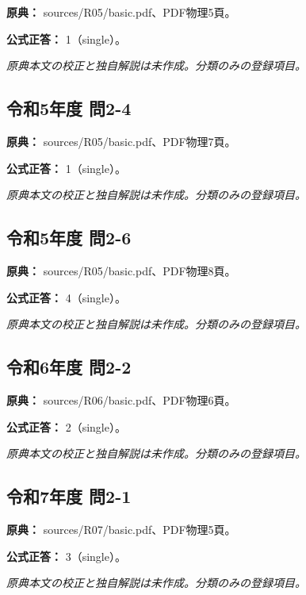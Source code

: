 \noindent\textbf{原典：} sources/R05/basic.pdf、PDF物理5頁。

\textbf{公式正答：} 1（single）。

\par\textit{原典本文の校正と独自解説は未作成。分類のみの登録項目。}

\subsection{令和5年度 問2-4}
\label{q:r05-reg-basic-2-4}

\noindent\textbf{原典：} sources/R05/basic.pdf、PDF物理7頁。

\textbf{公式正答：} 1（single）。

\par\textit{原典本文の校正と独自解説は未作成。分類のみの登録項目。}

\subsection{令和5年度 問2-6}
\label{q:r05-reg-basic-2-6}

\noindent\textbf{原典：} sources/R05/basic.pdf、PDF物理8頁。

\textbf{公式正答：} 4（single）。

\par\textit{原典本文の校正と独自解説は未作成。分類のみの登録項目。}

\subsection{令和6年度 問2-2}
\label{q:r06-reg-basic-2-2}

\noindent\textbf{原典：} sources/R06/basic.pdf、PDF物理6頁。

\textbf{公式正答：} 2（single）。

\par\textit{原典本文の校正と独自解説は未作成。分類のみの登録項目。}

\subsection{令和7年度 問2-1}
\label{q:r07-reg-basic-2-1}

\noindent\textbf{原典：} sources/R07/basic.pdf、PDF物理5頁。

\textbf{公式正答：} 3（single）。

\par\textit{原典本文の校正と独自解説は未作成。分類のみの登録項目。}
